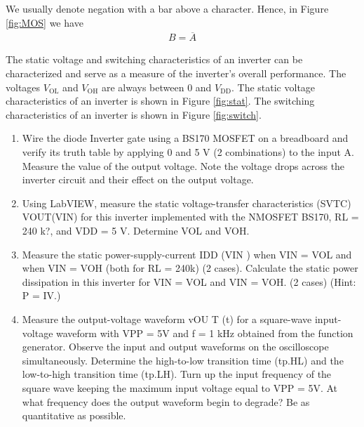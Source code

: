 \documentclass[12pt]{../manual}
\begin{document}
We usually denote negation with a bar above a character. Hence, in Figure \ref{fig:MOS} we have 
\begin{align}
B = \overline{A}
\end{align}

The static voltage and switching characteristics of an inverter can be characterized and serve as a measure of the inverter's overall performance. The voltages $V_\mathrm{OL}$ and $V_\mathrm{OH}$ are always between 0 and $V_\mathrm{DD}$. The static voltage characteristics of an inverter is shown in Figure \ref{fig:stat}. The switching characteristics of an inverter is shown in Figure \ref{fig:switch}.

\begin{enumerate}
\item Wire the diode Inverter gate using a BS170 MOSFET on a breadboard and verify its
truth table by applying 0 and 5 V (2 combinations) to the input A. Measure the value of
the output voltage. Note the voltage drops across the inverter circuit and their effect on
the output voltage.
\item Using LabVIEW, measure the static voltage-transfer characteristics (SVTC)
VOUT(VIN) for this inverter implemented with the NMOSFET BS170, RL = 240 k?,
and VDD = 5 V. Determine VOL and VOH.
\item Measure the static power-supply-current IDD (VIN ) when VIN = VOL and when VIN
= VOH (both for RL = 240k) (2 cases). Calculate the static power dissipation in this
inverter for VIN = VOL and VIN = VOH. (2 cases) (Hint: P = IV.)
\item Measure the output-voltage waveform vOU T (t) for a square-wave input-voltage
waveform with VPP = 5V and f = 1 kHz obtained from the function generator. Observe
the input and output waveforms on the oscilloscope simultaneously. Determine the
high-to-low transition time (tp.HL) and the low-to-high transition time (tp.LH). Turn up the
input frequency of the square wave keeping the maximum input voltage equal to VPP =
5V. At what frequency does the output waveform begin to degrade? Be as quantitative
as possible.
\end{enumerate}

\newpage
\end{document}
